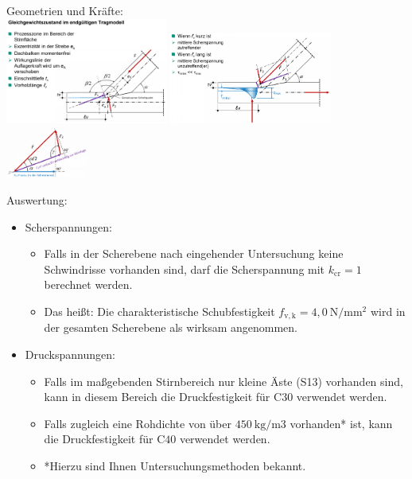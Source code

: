 \documentclass[fleqn,twoside]{article}
\begin{document}
    Geometrien und Kräfte:
    \vspace*{3mm}\\
    \includegraphics[width=0.4\textwidth]{Grafiken/Zimmermansmaessige Verbindungen/Stirnversatz/Stirnversatz Ueberblick.png}
    \includegraphics[width=0.4\textwidth]{Grafiken/Zimmermansmaessige Verbindungen/Stirnversatz/Stirnversatz Einfluss Vorholzlaenge.png}
    \includegraphics[width=0.2\textwidth]{Grafiken/Zimmermansmaessige Verbindungen/Stirnversatz/Stirnversatz Kraefte.png}

     Auswertung:
     \begin{itemize}
         \item Scherspannungen:
            \begin{itemize}
                \item Falls in der Scherebene nach eingehender Untersuchung keine Schwindrisse vorhanden sind, darf die Scherspannung mit $k_{\mathrm{cr}}=1$ berechnet werden.
                \item Das heißt: Die charakteristische Schubfestigkeit $f_{\mathrm{v}, \mathrm{k}}=4,0 \mathrm{~N} / \mathrm{mm}^2$ wird in der gesamten Scherebene als wirksam angenommen.
            \end{itemize}
        \item Druckspannungen:
            \begin{itemize}
                \item Falls im maßgebenden Stirnbereich nur kleine Äste (S13) vorhanden sind, kann in diesem Bereich die Druckfestigkeit für $\mathrm{C} 30$ verwendet werden.
                \item Falls zugleich eine Rohdichte von über $450 \mathrm{~kg} / \mathrm{m} 3$ vorhanden* ist, kann die Druckfestigkeit für $\mathrm{C} 40$ verwendet werden.
                \item *Hierzu sind Ihnen Untersuchungsmethoden bekannt.
            \end{itemize}
     \end{itemize}
\end{document}
